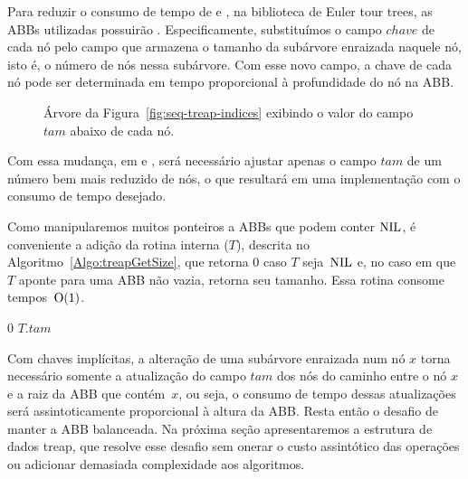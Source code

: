

Para reduzir o consumo de tempo de \treapJoin{} e \treapSplit{}, na biblioteca de Euler tour trees, as ABBs utilizadas possuirão .
Especificamente, substituímos o campo $chave$ de cada nó pelo campo  que armazena o tamanho da subárvore enraizada naquele nó, isto é, o número de nós nessa subárvore.
Com esse novo campo, a chave de cada nó pode ser determinada em tempo proporcional à profundidade do nó na ABB.

\begin{figure}[htb]
\centering

\caption{Árvore da Figura~\ref{fig:seq-treap-indices} exibindo o valor do campo $tam$ abaixo de cada nó.}
\label{fig:seq-treap-size}
\end{figure}

Com essa mudança, em \treapJoin{} e \treapSplit{}, será necessário ajustar apenas o campo $tam$ de um número bem mais reduzido de nós, o que resultará em uma implementação com o consumo de tempo desejado.

Como manipularemos muitos ponteiros a ABBs que podem conter $\text{NIL}$, é conveniente a adição da rotina interna \treapGetSize($T$), descrita no Algoritmo~\ref{Algo:treapGetSize}, que retorna $0$ caso $T$ seja~$\text{NIL}$ e, no caso em que $T$ aponte para uma ABB não vazia, retorna seu tamanho. Essa rotina consome tempos~$\mathrm{O}(1)$.

\begin{algorithm}[!htb]
\caption{\treapGetSize($T$)}
\label{Algo:treapGetSize}
\begin{algorithmic}[1]
\State \Return $0$
\EndIf
\State \Return $T$.$tam$
\end{algorithmic}
\end{algorithm}

Com chaves implícitas, a alteração de uma subárvore enraizada num nó $x$ torna necessário somente a atualização do campo $tam$ dos nós do caminho entre o nó $x$ e a raiz da ABB que contém~$x$, ou seja, o consumo de tempo dessas atualizações será assintoticamente proporcional à altura da ABB. Resta então o desafio de manter a ABB balanceada. Na próxima seção apresentaremos a estrutura de dados treap, que resolve esse desafio sem onerar o custo assintótico das operações ou adicionar demasiada complexidade aos algoritmos.

